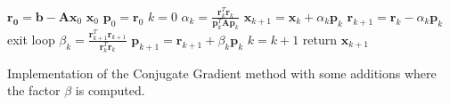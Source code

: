 \begin{algorithm}
\begin{algorithmic}
\State $\mathbf{r_0} = \mathbf{b} - \mathbf{A} \mathbf{x}_0$
    \Return $\mathbf{x}_0$
\EndIf
\State $\mathbf{p}_0=\mathbf{r}_0$
\State $k=0$
\State $\alpha_k = \frac{\mathbf{r}_k^T\mathbf{r}_k}{\mathbf{p}_k^T\mathbf{A}\mathbf{p}_k}$
\State $ \mathbf{x}_{k+1} = \mathbf{x}_k + \alpha_k \mathbf{p}_k$
\State $ \mathbf{r}_{k+1} = \mathbf{r}_k - \alpha_k \mathbf{p}_k$
   \State exit loop
\EndIf
\State $\beta_k = \frac{\mathbf{r}_{k+1}^T\mathbf{r}_{k+1}}{\mathbf{r}_k^T\mathbf{r}_k}$
\State $\mathbf{p}_{k+1}=\mathbf{r}_{k+1} + \beta_k \mathbf{p}_k$
\State $k=k+1$
\EndWhile
\State return $\mathbf{x}_{k+1}$
\end{algorithmic}
\caption{Implementation of the Conjugate Gradient method with some additions where the factor $\beta$ is computed.}
\label{alg:cg}
\end{algorithm}


